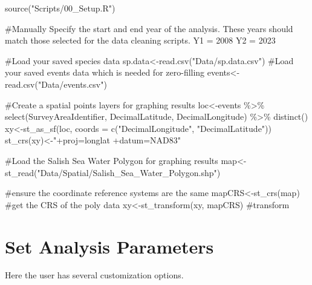 \documentclass[
  letterpaper,
  DIV=11,
  numbers=noendperiod]{scrreprt}
\newenvironment{Shaded}{\begin{snugshade}}{\end{snugshade}}
\newcommand{\AttributeTok}[1]{\textcolor[rgb]{0.40,0.45,0.13}{#1}}
\newcommand{\CommentTok}[1]{\textcolor[rgb]{0.37,0.37,0.37}{#1}}
\newcommand{\DecValTok}[1]{\textcolor[rgb]{0.68,0.00,0.00}{#1}}
\newcommand{\FunctionTok}[1]{\textcolor[rgb]{0.28,0.35,0.67}{#1}}
\newcommand{\NormalTok}[1]{\textcolor[rgb]{0.00,0.23,0.31}{#1}}
\newcommand{\OtherTok}[1]{\textcolor[rgb]{0.00,0.23,0.31}{#1}}
\newcommand{\SpecialCharTok}[1]{\textcolor[rgb]{0.37,0.37,0.37}{#1}}
\newcommand{\StringTok}[1]{\textcolor[rgb]{0.13,0.47,0.30}{#1}}
\begin{document}
\begin{Shaded}
\begin{Highlighting}[]
\FunctionTok{source}\NormalTok{(}\StringTok{"Scripts/00\_Setup.R"}\NormalTok{)}

\CommentTok{\#Manually Specify the start and end year of the analysis. These years should match those selected for the data cleaning scripts. }
\NormalTok{Y1 }\OtherTok{=} \DecValTok{2008}
\NormalTok{Y2 }\OtherTok{=} \DecValTok{2023}

\CommentTok{\#Load your saved species data }
\NormalTok{sp.data}\OtherTok{\textless{}{-}}\FunctionTok{read.csv}\NormalTok{(}\StringTok{"Data/sp.data.csv"}\NormalTok{)}
\CommentTok{\#Load your saved events data which is needed for zero{-}filling}
\NormalTok{events}\OtherTok{\textless{}{-}}\FunctionTok{read.csv}\NormalTok{(}\StringTok{"Data/events.csv"}\NormalTok{)}

\CommentTok{\#Create a spatial points layers for graphing results}
\NormalTok{loc}\OtherTok{\textless{}{-}}\NormalTok{events }\SpecialCharTok{\%\textgreater{}\%} \FunctionTok{select}\NormalTok{(SurveyAreaIdentifier, DecimalLatitude, DecimalLongitude) }\SpecialCharTok{\%\textgreater{}\%} \FunctionTok{distinct}\NormalTok{()}
\NormalTok{xy}\OtherTok{\textless{}{-}}\FunctionTok{st\_as\_sf}\NormalTok{(loc, }\AttributeTok{coords =} \FunctionTok{c}\NormalTok{(}\StringTok{"DecimalLongitude"}\NormalTok{, }\StringTok{"DecimalLatitude"}\NormalTok{))}
\FunctionTok{st\_crs}\NormalTok{(xy)}\OtherTok{\textless{}{-}}\StringTok{"+proj=longlat +datum=NAD83"}

\CommentTok{\#Load the Salish Sea Water Polygon for graphing results }
\NormalTok{map}\OtherTok{\textless{}{-}} \FunctionTok{st\_read}\NormalTok{(}\StringTok{"Data/Spatial/Salish\_Sea\_Water\_Polygon.shp"}\NormalTok{)}

\CommentTok{\#ensure the coordinate reference systems are the same}
\NormalTok{mapCRS}\OtherTok{\textless{}{-}}\FunctionTok{st\_crs}\NormalTok{(map) }\CommentTok{\#get the CRS of the poly data}
\NormalTok{xy}\OtherTok{\textless{}{-}}\FunctionTok{st\_transform}\NormalTok{(xy, mapCRS) }\CommentTok{\#transform }
\end{Highlighting}
\end{Shaded}

\section{Set Analysis Parameters}\label{3.1Analysis}

Here the user has several customization options.
\end{document}
